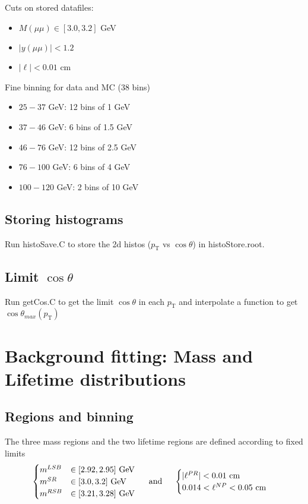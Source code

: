 \documentclass{article}
\newcommand{\pt}{p_\text{T}}
\newcommand{\cost}{\cos\theta}
\begin{document}
Cuts on stored datafiles:
\begin{itemize}
\item $M(\mu\mu)\in[3.0,3.2]$ GeV
\item $|y(\mu\mu)|<1.2$
\item $|\ell|<0.01$ cm
\end{itemize}

Fine binning for data and MC (38 bins)
\begin{itemize}
\item $25-37$ GeV: 12 bins of 1 GeV
\item $37-46$ GeV: 6 bins of 1.5 GeV
\item $46-76$ GeV: 12 bins of 2.5 GeV
\item $76-100$ GeV: 6 bins of 4 GeV
\item $100-120$ GeV: 2 bins of 10 GeV
\end{itemize}

\subsection{Storing histograms}

Run histoSave.C to store the 2d histos ($\pt$ vs $\cost$) in histoStore.root.

\subsection{Limit $\cost$}

Run getCos.C to get the limit $\cost$ in each $\pt$ and interpolate a function to get $\cost_{max}(\pt)$

\pagebreak

\section{Background fitting: Mass and Lifetime distributions}
\subsection{Regions and binning} 

The three mass regions and the two lifetime regions are defined according to fixed limits
\begin{equation}\begin{cases}
m^{LSB}&\in[2.92, 2.95] \text{ GeV}\\
m^{SR}&\in[3.0, 3.2]  \text{ GeV}\\
m^{RSB}&\in[3.21, 3.28]  \text{ GeV}\\
\end{cases}\hspace{0.5cm}\text{and}\hspace{0.5cm}
\begin{cases}
|\ell^{PR}| < 0.01\text{ cm} \\
0.014 < \ell^{NP} < 0.05\text{ cm}
\end{cases}
\end{equation}
\end{document}
